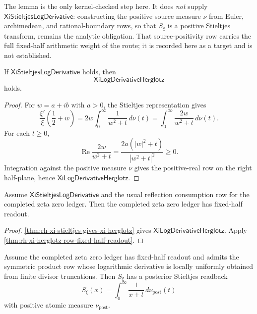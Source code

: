 The lemma is the only kernel-checked step here.  It does \emph{not} supply
$\mathsf{XiStieltjesLogDerivative}$: constructing the positive source measure
$\nu$ from Euler, archimedean, and rational-boundary rows, so that $S_\xi$ is a
positive Stieltjes transform, remains the analytic obligation.  That
source-positivity row carries the full fixed-half arithmetic weight of the
route; it is recorded here as a target and is not established.

\begin{theorem}
\label{thm:rh-xi-stieltjes-gives-xi-herglotz}
If $\mathsf{XiStieltjesLogDerivative}$ holds, then
$$
\mathsf{XiLogDerivativeHerglotz}
$$
holds.
\end{theorem}

\begin{proof}
For $w=a+ib$ with $a>0$, the Stieltjes representation gives
$$
\frac{\xi'}{\xi}\left(\frac12+w\right)
=
2w
\int_0^\infty\frac{1}{w^2+t}\,d\nu(t)
=
\int_0^\infty\frac{2w}{w^2+t}\,d\nu(t).
$$
For each $t\ge0$,
$$
\operatorname{Re}
\frac{2w}{w^2+t}
=
\frac{2a(|w|^2+t)}{|w^2+t|^2}
\ge0.
$$
Integration against the positive measure $\nu$ gives the positive-real
row on the right half-plane, hence
$\mathsf{XiLogDerivativeHerglotz}$.
\end{proof}

\begin{corollary}
\label{cor:rh-xi-stieltjes-log-derivative-fixed-half-readout}
Assume $\mathsf{XiStieltjesLogDerivative}$ and the usual reflection
consumption row for the completed zeta zero ledger.  Then the completed
zeta zero ledger has fixed-half readout.
\end{corollary}

\begin{proof}
\autoref{thm:rh-xi-stieltjes-gives-xi-herglotz} gives
$\mathsf{XiLogDerivativeHerglotz}$.  Apply
\autoref{thm:rh-xi-herglotz-row-fixed-half-readout}.
\end{proof}

\begin{theorem}
\label{thm:rh-fixed-half-divisor-gives-posterior-stieltjes}
Assume the completed zeta zero ledger has fixed-half readout and admits
the symmetric product row whose logarithmic derivative is locally
uniformly obtained from finite divisor truncations.  Then $S_\xi$ has a
posterior Stieltjes readback
$$
S_\xi(x)
=
\int_0^\infty\frac{1}{x+t}\,d\nu_{\mathrm{post}}(t)
$$
with positive atomic measure $\nu_{\mathrm{post}}$.
\end{theorem}

